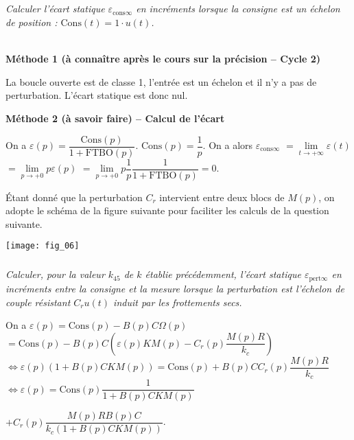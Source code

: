 \begin{multicols}{2}

\subparagraph{}\textit{Calculer%
l’écart statique $\varepsilon_{\text{cons} \infty}$ en incréments lorsque la consigne est un échelon de position : $\text{Cons}(t) = 1\cdot u(t)$.}
\ifprof
\begin{corrige}~\\
\textbf{Méthode 1 (à connaître après le cours sur la précision -- Cycle 2)}

La boucle ouverte est de classe 1, l'entrée est un échelon et il n'y a pas de perturbation. L'écart statique est donc nul.


\textbf{Méthode 2 (à savoir faire) -- Calcul de l'écart}

On a $\varepsilon(p)=\dfrac{\text{Cons}(p)}{1+\text{FTBO}(p)}$. $\text{Cons}(p)=\dfrac{1}{p}$.
On a alors 
$\varepsilon_{\text{cons} \infty} $
$= \lim\limits_{t\to+\infty} \varepsilon(t)$ 
$ = \lim\limits_{p\to+0} p\varepsilon(p)$ 
$ = \lim\limits_{p\to+0} p\dfrac{1}{p}\dfrac{1}{1+\text{FTBO}(p)}=0$.
 



\end{corrige}
\else
\fi


Étant donné que la perturbation $C_r$ intervient entre deux blocs de $M(p)$, on adopte le schéma de la 
figure suivante pour faciliter les calculs de la question suivante. 

\begin{center}
\texttt{[image: fig\_06]}
\end{center}


\subparagraph{}\textit{Calculer, pour la valeur $k_{45}$ de $k$ établie précédemment, l’écart statique $\varepsilon_{\text{pert} \infty}$ en incréments entre la consigne et la mesure lorsque la perturbation est l’échelon de couple résistant $C_r u(t)$ induit par les frottements secs. }
\ifprof
\begin{corrige}
On  a $\varepsilon(p)=\text{Cons}(p)-B(p)C\Omega(p)$ $=\text{Cons}(p)-B(p)C\left( \varepsilon(p) K M(p)- C_r(p) \dfrac{M(p)R}{k_c} \right)$ $ \Leftrightarrow \varepsilon(p) \left(1+ B(p)C  K M(p)\right)=\text{Cons}(p) +B(p)C C_r(p) \dfrac{M(p)R}{k_c}  $
$ \Leftrightarrow \varepsilon(p) =\text{Cons}(p)\dfrac{1}{1+ B(p)C  K M(p)}  $

$+ C_r(p) \dfrac{M(p)R B(p)C}{k_c\left( 1+ B(p)C  K M(p) \right)}  $.


\end{corrige}
\end{multicols}
